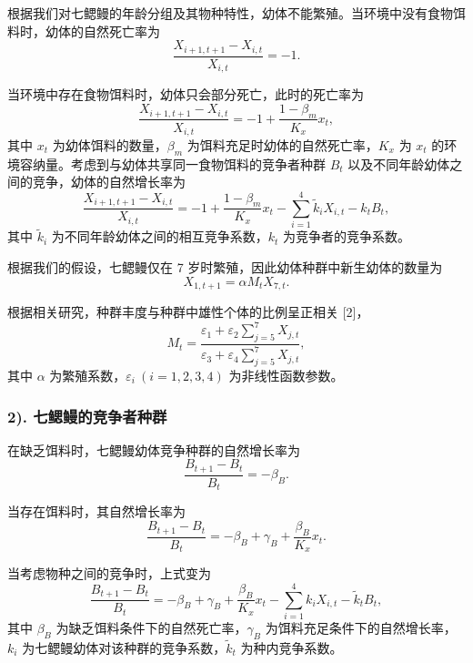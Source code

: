 \documentclass[11pt,a4paper]{ctexart}
\begin{document}
根据我们对七鳃鳗的年龄分组及其物种特性，幼体不能繁殖。当环境中没有食物饵料时，幼体的自然死亡率为
\begin{equation}
\frac{X_{i+1,t+1}-X_{i,t}}{X_{i,t}}=-1.
\end{equation}

当环境中存在食物饵料时，幼体只会部分死亡，此时的死亡率为
\begin{equation}
\frac{X_{i+1,t+1}-X_{i,t}}{X_{i,t}}=-1+\frac{1-\beta_m}{K_x}x_t,
\end{equation}
其中 $x_t$ 为幼体饵料的数量，$\beta_m$ 为饵料充足时幼体的自然死亡率，$K_x$ 为 $x_t$ 的环境容纳量。考虑到与幼体共享同一食物饵料的竞争者种群 $B_t$ 以及不同年龄幼体之间的竞争，幼体的自然增长率为
\begin{equation}
\frac{X_{i+1,t+1}-X_{i,t}}{X_{i,t}}=-1+\frac{1-\beta_m}{K_x}x_t-\sum_{i=1}^{4}\tilde{k}_iX_{i,t}-k_tB_t,
\end{equation}
其中 $\tilde{k}_i$ 为不同年龄幼体之间的相互竞争系数，$k_t$ 为竞争者的竞争系数。

根据我们的假设，七鳃鳗仅在 7 岁时繁殖，因此幼体种群中新生幼体的数量为
\begin{equation}
X_{1,t+1}=\alpha M_tX_{7,t}.
\end{equation}

根据相关研究，种群丰度与种群中雄性个体的比例呈正相关 [2]，
\begin{equation}
M_t=\frac{\varepsilon_1+\varepsilon_2\sum\limits_{j=5}^{7}X_{j,t}}{\varepsilon_3+\varepsilon_4\sum\limits_{j=5}^{7}X_{j,t}},
\end{equation}
其中 $\alpha$ 为繁殖系数，$\varepsilon_i\ (i=1,2,3,4)$ 为非线性函数参数。

\subsubsection*{2). 七鳃鳗的竞争者种群}

在缺乏饵料时，七鳃鳗幼体竞争种群的自然增长率为
\begin{equation}
\frac{B_{t+1}-B_t}{B_t}=-\beta_B.
\end{equation}

当存在饵料时，其自然增长率为
\begin{equation}
\frac{B_{t+1}-B_t}{B_t}=-\beta_B+\gamma_B+\frac{\beta_B}{K_x}x_t.
\end{equation}

当考虑物种之间的竞争时，上式变为
\begin{equation}
\frac{B_{t+1}-B_t}{B_t}=-\beta_B+\gamma_B+\frac{\beta_B}{K_x}x_t-\sum_{i=1}^{4}k_iX_{i,t}-\tilde{k}_tB_t,
\end{equation}
其中 $\beta_B$ 为缺乏饵料条件下的自然死亡率，$\gamma_B$ 为饵料充足条件下的自然增长率，$k_i$ 为七鳃鳗幼体对该种群的竞争系数，$\tilde{k}_t$ 为种内竞争系数。
\end{document}
